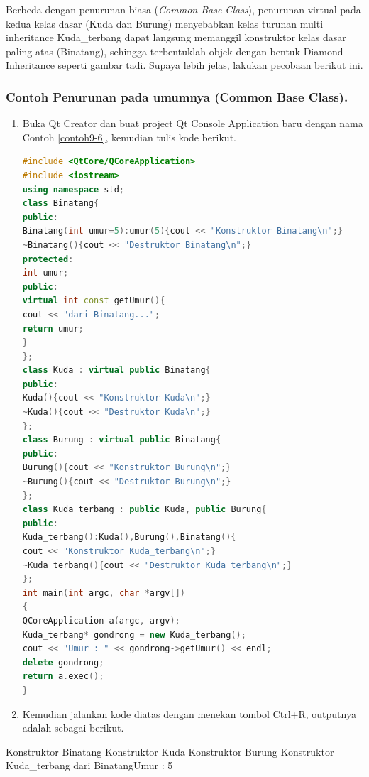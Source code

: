 Berbeda dengan penurunan biasa (\emph{Common Base Class}), penurunan
virtual pada kedua kelas dasar (Kuda dan Burung) menyebabkan kelas
turunan multi inheritance Kuda\_terbang dapat langsung memanggil
konstruktor kelas dasar paling atas (Binatang), sehingga terbentuklah
objek dengan bentuk Diamond Inheritance seperti gambar tadi. Supaya
lebih jelas, lakukan pecobaan berikut ini.

\subsubsection*{Contoh  Penurunan pada umumnya (Common Base Class).}

\begin{enumerate}

\item
  Buka Qt Creator dan buat project Qt Console Application baru dengan
  nama Contoh \ref{contoh9-6}, kemudian tulis kode berikut.

\begin{lstlisting}[language=c++, caption= Penurunan pada umumnya (Common Base Class), label=contoh9-6]
#include <QtCore/QCoreApplication>
#include <iostream>
using namespace std;
class Binatang{
public:
Binatang(int umur=5):umur(5){cout << "Konstruktor Binatang\n";}
~Binatang(){cout << "Destruktor Binatang\n";}
protected:
int umur;
public:
virtual int const getUmur(){
cout << "dari Binatang...";
return umur;
}
};
class Kuda : virtual public Binatang{
public:
Kuda(){cout << "Konstruktor Kuda\n";}
~Kuda(){cout << "Destruktor Kuda\n";}
};
class Burung : virtual public Binatang{
public:
Burung(){cout << "Konstruktor Burung\n";}
~Burung(){cout << "Destruktor Burung\n";}
};
class Kuda_terbang : public Kuda, public Burung{
public:
Kuda_terbang():Kuda(),Burung(),Binatang(){
cout << "Konstruktor Kuda_terbang\n";}
~Kuda_terbang(){cout << "Destruktor Kuda_terbang\n";}
};
int main(int argc, char *argv[])
{
QCoreApplication a(argc, argv);
Kuda_terbang* gondrong = new Kuda_terbang();
cout << "Umur : " << gondrong->getUmur() << endl;
delete gondrong;
return a.exec();
}
\end{lstlisting}
\item
  Kemudian jalankan kode diatas dengan menekan tombol Ctrl+R, outputnya
  adalah sebagai berikut.
\end{enumerate}
\begin{lcverbatim}
Konstruktor Binatang
Konstruktor Kuda 
Konstruktor Burung
Konstruktor Kuda_terbang dari
BinatangUmur : 5
\end{lcverbatim}


